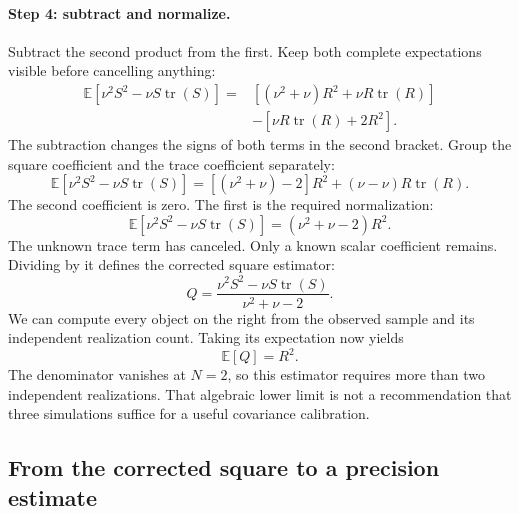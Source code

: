 \documentclass[11pt]{article}
\newcommand{\E}{\mathbb{E}}
\begin{document}
\paragraph{Step 4: subtract and normalize.}
Subtract the second product from the first. Keep both complete
expectations visible before cancelling anything:
\begin{equation}
 \begin{split}
 \E[\nu^2S^2-\nu S\operatorname{tr}(S)]
 ={}&[(\nu^2+\nu)R^2+\nu R\operatorname{tr}(R)]\\
    &-[\nu R\operatorname{tr}(R)+2R^2].
 \end{split}
\end{equation}
The subtraction changes the signs of both terms in the second bracket.
Group the square coefficient and the trace coefficient separately:
\begin{equation}
 \E[\nu^2S^2-\nu S\operatorname{tr}(S)]
 =[(\nu^2+\nu)-2]R^2+(\nu-\nu)R\operatorname{tr}(R).
\end{equation}
The second coefficient is zero. The first is the required normalization:
\begin{equation}
 \E[\nu^2S^2-\nu S\operatorname{tr}(S)]
                       =(\nu^2+\nu-2)R^2.
\end{equation}
The unknown trace term has canceled. Only a known scalar coefficient
remains. Dividing by it defines the corrected square estimator:
\begin{equation}
 Q=\frac{\nu^2S^2-\nu S\operatorname{tr}(S)}{\nu^2+\nu-2}.
 \label{eq:Q-recipe}
\end{equation}
We can compute every object on the right from the observed sample and its
independent realization count. Taking its expectation now yields
\begin{equation}
 \E[Q]=R^2.
\end{equation}
The denominator vanishes at $N=2$, so this estimator requires more than two
independent realizations. That algebraic lower limit is not a recommendation
that three simulations suffice for a useful covariance calibration.

\subsection{From the corrected square to a precision estimate}
\end{document}
